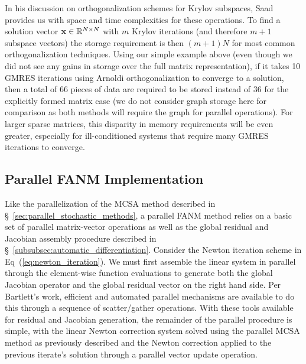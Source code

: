 In his discussion on orthogonalization schemes for Krylov subspaces,
Saad provides us with space and time complexities for these
operations. To find a solution vector $\mathbf{x} \in \mathbb{R}^{N \times
  N}$ with $m$ Krylov iterations (and therefore $m+1$ subspace
vectors) the storage requirement is then $(m+1) N$ for most common
orthogonalization techniques. Using our simple example above (even
though we did not see any gains in storage over the full matrix
representation), if it takes 10 GMRES iterations using Arnoldi
orthogonalization to converge to a solution, then a total of 66 pieces
of data are required to be stored instead of 36 for the explicitly
formed matrix case (we do not consider graph storage here for
comparison as both methods will require the graph for parallel
operations). For larger sparse matrices, this disparity in memory
requirements will be even greater, especially for ill-conditioned
systems that require many GMRES iterations to converge.

\subsection{Parallel FANM Implementation}
\label{subsec:parallel_fanm}
Like the parallelization of the MCSA method described in
\S~\ref{sec:parallel_stochastic_methods}, a parallel FANM method
relies on a basic set of parallel matrix-vector operations as well as
the global residual and Jacobian assembly procedure described in
\S~\ref{subsubsec:automatic_differentiation}. Consider the Newton
iteration scheme in Eq~(\ref{eq:newton_iteration}). We must first
assemble the linear system in parallel through the element-wise
function evaluations to generate both the global Jacobian operator and
the global residual vector on the right hand side. Per Bartlett's
work, efficient and automated parallel mechanisms are available to do
this through a sequence of scatter/gather operations. With these tools
available for residual and Jacobian generation, the remainder of the
parallel procedure is simple, with the linear Newton correction system
solved using the parallel MCSA method as previously described and the
Newton correction applied to the previous iterate's solution through a
parallel vector update operation.

